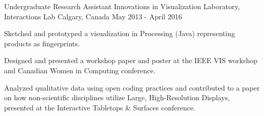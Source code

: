 \begin{cventries}
  \cventry
    {Undergraduate Research Assistant}
    {Innovations in Visualization Laboratory, Interactions Lab}
    {Calgary, Canada}
    {May 2013 - April 2016}
    {
      \begin{cvitems}
        \item {Sketched and prototyped a visualization in Processing (Java) representing products as fingerprints.}
        \item {Designed and presented a workshop paper and poster at the IEEE VIS workshop and Canadian Women in Computing conference.}
        \item {Analyzed qualitative data using open coding practices and contributed to a paper on how non-scientific disciplines utilize Large, High-Resolution Displays, presented at the Interactive Tabletops \& Surfaces conference.}
      \end{cvitems}
    }

 \end{cventries}
